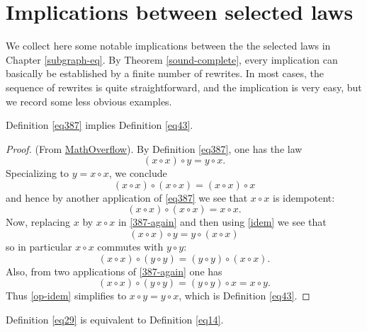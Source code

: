 \chapter{Implications between selected laws}

We collect here some notable implications between the the selected laws in Chapter \ref{subgraph-eq}.   By Theorem \ref{sound-complete}, every implication can basically be established by a finite number of rewrites.  In most cases, the sequence of rewrites is quite straightforward, and the implication is very easy, but we record some less obvious examples.

\begin{theorem}[387 implies 43]\label{387_implies_43}\leanok  Definition \ref{eq387} implies Definition \ref{eq43}.
\end{theorem}

\begin{proof}\leanok (From \href{https://mathoverflow.net/a/450905/766}{MathOverflow}).
  By Definition \ref{eq387}, one has the law
\begin{equation}\label{387-again}
  (x \circ x) \circ y = y \circ x.
\end{equation}
Specializing to $y=x \circ x$, we conclude
$$(x \circ x) \circ (x \circ x) = (x \circ x) \circ x$$
and hence by another application of \eqref{eq387} we see that $x \circ x$ is idempotent:
\begin{equation}\label{idem}
  (x \circ x) \circ (x \circ x) = x \circ x.
\end{equation}
Now, replacing $x$ by $x \circ x$ in \eqref{387-again} and then using \eqref{idem} we see that
$$ (x \circ x) \circ y = y \circ (x \circ x)$$
so in particular $x \circ x$ commutes with $y \circ y$:
\begin{equation}\label{op-idem} (x \circ x) \circ (y \circ y) = (y \circ y) \circ (x \circ x).
\end{equation}
Also, from two applications of \eqref{387-again} one has
$$(x \circ x) \circ (y \circ y) = (y \circ y) \circ x = x \circ y.$$
Thus \eqref{op-idem} simplifies to $x \circ y = y \circ x$, which is Definition \ref{eq43}.
\end{proof}

\begin{theorem}[29 equivalent to 14]\label{29_equiv_14} \leanok  Definition \ref{eq29} is equivalent to Definition \ref{eq14}.
\end{theorem}

